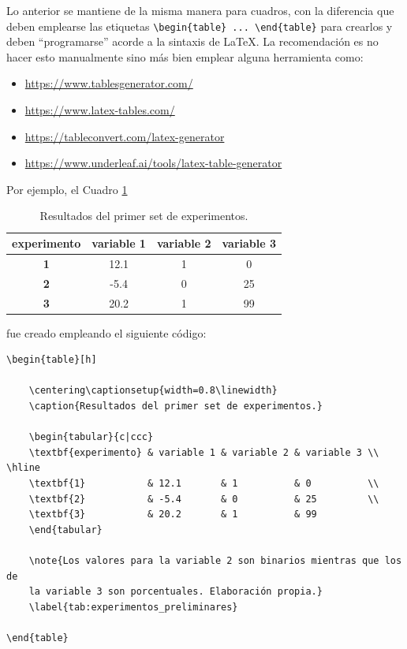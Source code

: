 Lo anterior se mantiene de la misma manera para cuadros, con la diferencia que deben emplearse las etiquetas \verb|\begin{table} ... \end{table}| para crearlos y deben ``programarse'' acorde a la sintaxis de \LaTeX. La recomendación es no hacer esto manualmente sino más bien emplear alguna herramienta como: 
\begin{itemize}
    \itemsep 0em
    \item \href{https://www.tablesgenerator.com/}{https://www.tablesgenerator.com/}
    \item \href{https://www.latex-tables.com/}{https://www.latex-tables.com/}
    \item \href{https://tableconvert.com/latex-generator}{https://tableconvert.com/latex-generator}
    \item \href{https://www.underleaf.ai/tools/latex-table-generator}{https://www.underleaf.ai/tools/latex-table-generator}
\end{itemize}

Por ejemplo, el Cuadro \ref{tab:experimentos_preliminares}
\begin{table}[h!]
    \centering\captionsetup{width=0.8\linewidth}
    \caption{Resultados del primer set de experimentos.}
    \begin{tabular}{c|ccc}
    \textbf{experimento} & variable 1 & variable 2 & variable 3 \\ \hline
    \textbf{1}           & 12.1       & 1          & 0          \\
    \textbf{2}           & -5.4       & 0          & 25         \\
    \textbf{3}           & 20.2       & 1          & 99        
    \end{tabular}
    \label{tab:experimentos_preliminares}  
\end{table}

fue creado empleando el siguiente código:
\begin{verbatim}
\begin{table}[h]

    \centering\captionsetup{width=0.8\linewidth}
    \caption{Resultados del primer set de experimentos.}
    
    \begin{tabular}{c|ccc}
    \textbf{experimento} & variable 1 & variable 2 & variable 3 \\ \hline
    \textbf{1}           & 12.1       & 1          & 0          \\
    \textbf{2}           & -5.4       & 0          & 25         \\
    \textbf{3}           & 20.2       & 1          & 99        
    \end{tabular}
    
    \note{Los valores para la variable 2 son binarios mientras que los de 
    la variable 3 son porcentuales. Elaboración propia.}
    \label{tab:experimentos_preliminares}
    
\end{table}
\end{verbatim}

